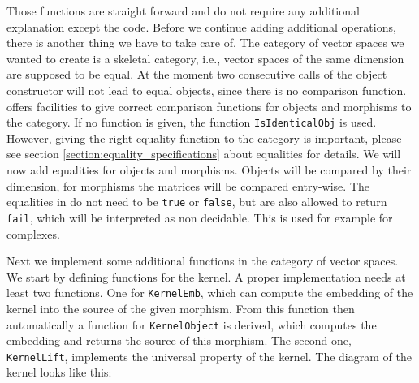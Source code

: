 Those functions are straight forward and do not require any additional explanation except the code. Before we continue
adding additional operations, there is another thing we have to take care of. The category of vector spaces we wanted
to create is a skeletal category, i.e., vector spaces of the same dimension are supposed to be equal. At the moment
two consecutive calls of the object constructor will not lead to equal objects, since there is no comparison function.
\CapPkg offers facilities to give correct comparison functions for objects and morphisms to the category. If no function
is given, the \GAP function \texttt{IsIdenticalObj} is used. However, giving the right equality function to the
category is important, please see section \ref{section:equality_specifications} about equalities for details. We will now add equalities
for objects and morphisms. Objects will be compared by their dimension, for morphisms the matrices will be compared entry-wise.
The equalities in \CapPkg do not need to be \texttt{true} or \texttt{false}, but are also allowed to return \texttt{fail},
which will be interpreted as non decidable. This is used for example for complexes.



Next we implement some additional functions in the category of vector spaces. We start by defining functions for the kernel.
A proper implementation needs at least two functions. One for \texttt{KernelEmb}, which can compute the embedding of the kernel
into the source of the given morphism. From this function then automatically a function for \texttt{KernelObject} is derived, which
computes the embedding and returns the source of this morphism. The second one, \texttt{KernelLift}, implements the universal property of the kernel.
The diagram of the kernel looks like this:
\begin{center}
\end{center}

